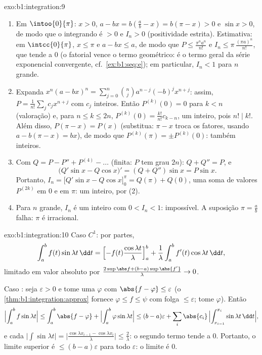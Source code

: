 \begin{solution}{exo:b1:integration:9}
\begin{enumerate}
  \item Em $\intoo{0}{\pi}$: $x > 0$, $a - bx = b(\frac ab - x) =
        b(\pi - x) > 0$ e $\sin x > 0$, de modo que o integrando é $> 0$
        e $I_n > 0$ (positividade estrita). Estimativa: em
        $\intcc{0}{\pi}$, $x \leq \pi$ e $a - bx \leq a$, de modo que $P
        \leq \frac{\pi^n a^n}{n!}$ e $I_n \leq
        \pi\,\frac{(\pi a)^n}{n!}$, que tende a $0$ (o
        fatorial vence o termo geométrico: é o termo geral
        da série exponencial convergente, cf.\
        \cref{ex:b1:seq:e}); em particular, $I_n < 1$ para $n$ grande.
  \item Expanda $x^n(a - bx)^n = \sum_{j=0}^{n} \binom nj a^{n-j}
        (-b)^j x^{n+j}$: assim, $P = \frac{1}{n!}\sum_j c_j x^{n+j}$
        com $c_j$ inteiros. Então $P^{(k)}(0) = 0$ para $k < n$
        (valoração) e, para $n \leq k \leq 2n$, $P^{(k)}(0) =
        \frac{k!}{n!} c_{k-n}$, um inteiro, pois $n! \mid k!$.
        Além disso, $P(\pi - x) = P(x)$ (substitua: $\pi - x$ troca
        os fatores, usando $a - b(\pi - x) = bx$), de modo que $P^{(k)}(\pi)
        = \pm P^{(k)}(0)$: também inteiros.
  \item Com $Q = P - P'' + P^{(4)} - \dots$ (finita: $P$ tem grau
        $2n$): $Q + Q'' = P$, e
        \[
        \bigl(Q'\sin x - Q\cos x\bigr)' = (Q + Q'')\sin x = P\sin x .
        \]
        Portanto, $I_n = \bigl[Q'\sin x - Q\cos x\bigr]_0^{\pi} = Q(\pi)
        + Q(0)$, uma soma de valores $P^{(2k)}$ em $0$ e em $\pi$: um
        inteiro, por (2).
  \item Para $n$ grande, $I_n$ é um inteiro com $0 < I_n < 1$:
        impossível. A suposição $\pi = \frac ab$ falha: $\pi$ é
        irracional.
\end{enumerate}
\end{solution}

\begin{solution}{exo:b1:integration:10}
Caso $C^1$: por partes,
\[
\int_a^b f(t)\sin\lambda t\,\dd t
= \Bigl[-f(t)\frac{\cos\lambda t}{\lambda}\Bigr]_a^b
+ \frac{1}{\lambda}\int_a^b f'(t)\cos\lambda t\,\dd t,
\]
limitado em valor absoluto por $\frac{2\sup\abs f + (b - a)\sup\abs{f'}}
{\lambda} \to 0$.

Caso : seja $\varepsilon > 0$ e tome uma 
$\varphi$ com $\abs{f - \varphi} \leq \varepsilon$
(o \cref{thm:b1:integration:approx} fornece $\varphi \leq f \leq
\psi$ com folga $\leq\varepsilon$; tome $\varphi$). Então
\[
\Bigl|\int_a^b f\sin\lambda t\Bigr|
\leq \int_a^b \abs{f - \varphi}
+ \Bigl|\int_a^b \varphi \sin\lambda t\Bigr|
\leq (b-a)\varepsilon
+ \sum_i \abs{c_i}\,\Bigl|\int_{x_{i-1}}^{x_i} \sin\lambda t\,\dd
t\Bigr| ,
\]
e cada $\bigl|\int \sin \lambda t\bigr| = \bigl|\frac{\cos\lambda
x_{i-1} - \cos\lambda x_i}{\lambda}\bigr| \leq \frac{2}{\lambda}$:
o segundo termo tende a $0$. Portanto, o limite superior é $\leq
(b-a)\varepsilon$ para todo $\varepsilon$: o limite é $0$.
\end{solution}

